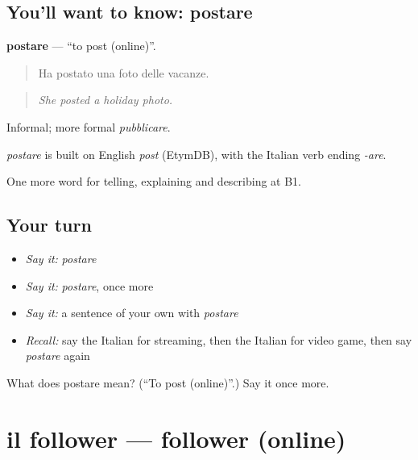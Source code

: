\subsection*{You'll want to know: postare}
\textbf{postare} — \textquotedblleft{}to post (online)\textquotedblright{}.

\begin{quote}
Ha postato una foto delle vacanze.
\end{quote}

\begin{quote}
\emph{She posted a holiday photo.}
\end{quote}

Informal; more formal \emph{pubblicare}.

\begin{cousinweb}
\emph{postare} is built on English \emph{post} (EtymDB), with the Italian verb ending \emph{-are}.
\end{cousinweb}

\begin{grammarlens}[title={What you've built}]
One more word for telling, explaining and describing at B1.
\end{grammarlens}

\subsection*{Your turn}
\begin{itemize}
\raggedright
  \item \emph{Say it:} \emph{postare}
  \item \emph{Say it:} \emph{postare}, once more
  \item \emph{Say it:} a sentence of your own with \emph{postare}
  \item \emph{Recall:} say the Italian for streaming, then the Italian for video game, then say \emph{postare} again
\end{itemize}

\begin{tcolorbox}[breakable,colback=teal!4,colframe=teal!35!black,title={Before you move on}]
What does postare mean? (\textquotedblleft{}To post (online)\textquotedblright{}.) Say it once more.
\end{tcolorbox}
\section[il follower]{il follower — follower (online)}

\label{lesson:IT-C530-follower}



